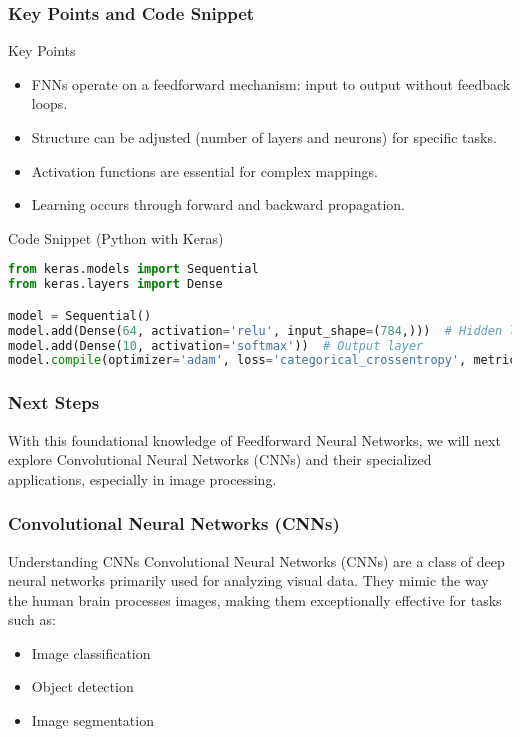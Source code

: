 \documentclass[aspectratio=169]{beamer}
\begin{document}
\begin{frame}[fragile]
    \frametitle{Key Points and Code Snippet}
    \begin{block}{Key Points}
        \begin{itemize}
            \item FNNs operate on a feedforward mechanism: input to output without feedback loops.
            \item Structure can be adjusted (number of layers and neurons) for specific tasks.
            \item Activation functions are essential for complex mappings.
            \item Learning occurs through forward and backward propagation.
        \end{itemize}
    \end{block}
    
    \begin{block}{Code Snippet (Python with Keras)}
    \begin{lstlisting}[language=Python]
from keras.models import Sequential
from keras.layers import Dense

model = Sequential()
model.add(Dense(64, activation='relu', input_shape=(784,)))  # Hidden layer
model.add(Dense(10, activation='softmax'))  # Output layer
model.compile(optimizer='adam', loss='categorical_crossentropy', metrics=['accuracy'])
    \end{lstlisting}
    \end{block}
\end{frame}

\begin{frame}[fragile]
    \frametitle{Next Steps}
    With this foundational knowledge of Feedforward Neural Networks, we will next explore Convolutional Neural Networks (CNNs) and their specialized applications, especially in image processing.
\end{frame}

\begin{frame}[fragile]
    \frametitle{Convolutional Neural Networks (CNNs)}
    \begin{block}{Understanding CNNs}
        Convolutional Neural Networks (CNNs) are a class of deep neural networks primarily used for analyzing visual data. They mimic the way the human brain processes images, making them exceptionally effective for tasks such as:
        \begin{itemize}
            \item Image classification
            \item Object detection
            \item Image segmentation
        \end{itemize}
    \end{block}
\end{frame}
\end{document}
